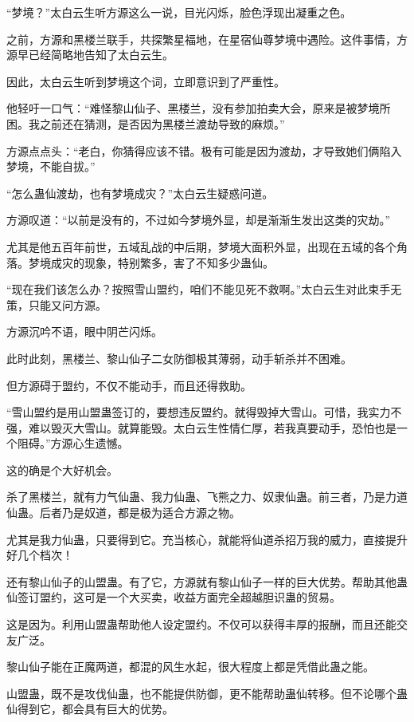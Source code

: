 
\begin{this_body}

“梦境？”太白云生听方源这么一说，目光闪烁，脸色浮现出凝重之色。

之前，方源和黑楼兰联手，共探繁星福地，在星宿仙尊梦境中遇险。这件事情，方源早已经简略地告知了太白云生。

因此，太白云生听到梦境这个词，立即意识到了严重性。

他轻吁一口气：“难怪黎山仙子、黑楼兰，没有参加拍卖大会，原来是被梦境所困。我之前还在猜测，是否因为黑楼兰渡劫导致的麻烦。”

方源点点头：“老白，你猜得应该不错。极有可能是因为渡劫，才导致她们俩陷入梦境，不能自拔。”

“怎么蛊仙渡劫，也有梦境成灾？”太白云生疑惑问道。

方源叹道：“以前是没有的，不过如今梦境外显，却是渐渐生发出这类的灾劫。”

尤其是他五百年前世，五域乱战的中后期，梦境大面积外显，出现在五域的各个角落。梦境成灾的现象，特别繁多，害了不知多少蛊仙。

“现在我们该怎么办？按照雪山盟约，咱们不能见死不救啊。”太白云生对此束手无策，只能又问方源。

方源沉吟不语，眼中阴芒闪烁。

此时此刻，黑楼兰、黎山仙子二女防御极其薄弱，动手斩杀并不困难。

但方源碍于盟约，不仅不能动手，而且还得救助。

“雪山盟约是用山盟蛊签订的，要想违反盟约。就得毁掉大雪山。可惜，我实力不强，难以毁灭大雪山。就算能毁。太白云生性情仁厚，若我真要动手，恐怕也是一个阻碍。”方源心生遗憾。

这的确是个大好机会。

杀了黑楼兰，就有力气仙蛊、我力仙蛊、飞熊之力、奴隶仙蛊。前三者，乃是力道仙蛊。后者乃是奴道，都是极为适合方源之物。

尤其是我力仙蛊，只要得到它。充当核心，就能将仙道杀招万我的威力，直接提升好几个档次！

还有黎山仙子的山盟蛊。有了它，方源就有黎山仙子一样的巨大优势。帮助其他蛊仙签订盟约，这可是一个大买卖，收益方面完全超越胆识蛊的贸易。

这是因为。利用山盟蛊帮助他人设定盟约。不仅可以获得丰厚的报酬，而且还能交友广泛。

黎山仙子能在正魔两道，都混的风生水起，很大程度上都是凭借此蛊之能。

山盟蛊，既不是攻伐仙蛊，也不能提供防御，更不能帮助蛊仙转移。但不论哪个蛊仙得到它，都会具有巨大的优势。


\end{this_body}
